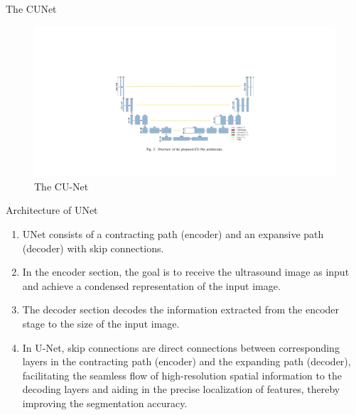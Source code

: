 \documentclass{beamer}
\begin{document}
\begin{frame}{The CUNet}
    \begin{figure}[H]
        \centering
        \includegraphics[width=\textwidth]{cunet.jpg}
        \caption{The CU-Net}
        \label{fig:b}
\end{figure}
\end{frame}
\begin{frame}{Architecture of UNet}
    \begin{enumerate}
        \item UNet consists of a contracting path (encoder) and an expansive path (decoder) with skip connections.
        \item In the encoder section, the goal is to receive the ultrasound image as input and achieve a condensed 
        representation of the input image.
        \item The decoder section decodes the information extracted from the encoder stage to the size of the input image.
        \item In U-Net, skip connections are direct connections between corresponding layers in the contracting
        path (encoder) and the expanding path (decoder), facilitating the seamless flow of high-resolution spatial 
        information to the decoding layers and aiding in the precise localization of features, thereby improving the 
        segmentation accuracy.
    \end{enumerate}
\end{frame}
\end{document}

